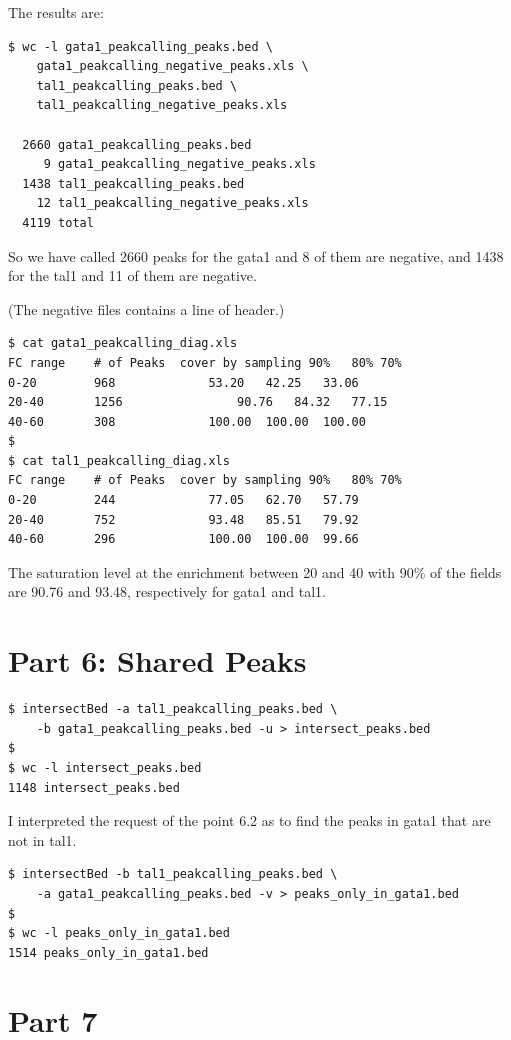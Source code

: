 \documentclass[11pt]{article} %
\begin{document}
The results are:

\begin{lstlisting}
$ wc -l gata1_peakcalling_peaks.bed \
    gata1_peakcalling_negative_peaks.xls \
    tal1_peakcalling_peaks.bed \
    tal1_peakcalling_negative_peaks.xls
    
  2660 gata1_peakcalling_peaks.bed
     9 gata1_peakcalling_negative_peaks.xls
  1438 tal1_peakcalling_peaks.bed
    12 tal1_peakcalling_negative_peaks.xls
  4119 total
\end{lstlisting}

So we have called 2660 peaks for the gata1 and 8 of them are negative, and 1438 for the tal1 and 11 of them are negative.

(The negative files contains a line of header.)
\begin{lstlisting}
$ cat gata1_peakcalling_diag.xls
FC range	# of Peaks	cover by sampling 90%	80%	70%	
0-20		968				53.20	42.25	33.06	
20-40		1256				90.76	84.32	77.15	
40-60		308				100.00	100.00	100.00	
$
$ cat tal1_peakcalling_diag.xls
FC range	# of Peaks	cover by sampling 90%	80%	70%	
0-20		244				77.05	62.70	57.79		
20-40		752				93.48	85.51	79.92		
40-60		296				100.00	100.00	99.66
\end{lstlisting}

The saturation level at the enrichment between 20 and 40 with 90\% of the fields are 90.76 and 93.48, respectively for gata1 and tal1.

\section{Part 6: Shared Peaks}

\begin{lstlisting}
$ intersectBed -a tal1_peakcalling_peaks.bed \
    -b gata1_peakcalling_peaks.bed -u > intersect_peaks.bed
$
$ wc -l intersect_peaks.bed 
1148 intersect_peaks.bed
\end{lstlisting}

I interpreted the request of the point 6.2 as to find the peaks in gata1 that are not in tal1.

\begin{lstlisting}
$ intersectBed -b tal1_peakcalling_peaks.bed \
    -a gata1_peakcalling_peaks.bed -v > peaks_only_in_gata1.bed
$ 
$ wc -l peaks_only_in_gata1.bed 
1514 peaks_only_in_gata1.bed
\end{lstlisting}

\section{Part 7}
\end{document}
